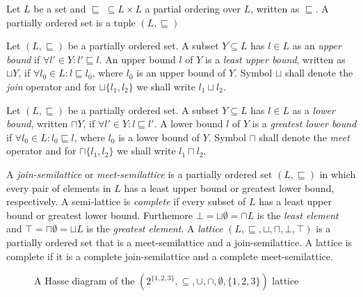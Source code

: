 \begin{defn}
Let $L$ be a set and $\sqsubseteq \; \subseteq L \times L$ a partial ordering over $L$, written as $\sqsubseteq$. A partially ordered set is a tuple $(L, \sqsubseteq)$
\end{defn}

\begin{defn}
Let $(L, \sqsubseteq)$ be a partially ordered set. A subset $Y \subseteq L$ has $l \in L$ as an \emph{upper bound} if $\forall l' \in Y: l' \sqsubseteq l$. An upper bound $l$ of $Y$ is a \emph{least upper bound}, written as $\sqcup Y$, if $\forall l_0 \in L: l \sqsubseteq l_0$, where $l_0$ is an upper bound of $Y$. Symbol $\sqcup$ shall denote the \emph{join} operator and for $\sqcup\{l_1, l_2\}$ we shall write $l_1 \sqcup l_2$.
\end{defn}

\begin{defn}
Let $(L, \sqsubseteq)$ be a partially ordered set. A subset $Y \subseteq L$ has $l \in L$ as a \emph{lower bound}, written $\sqcap Y$, if $\forall l' \in Y: l \sqsubseteq l'$. A lower bound $l$ of $Y$ is a \emph{greatest lower bound} if $\forall l_0 \in L: l_0 \sqsubseteq l$, where $l_0$ is a lower bound of $Y$. Symbol $\sqcap$ shall denote the \emph{meet} operator and for $\sqcap\{l_1, l_2\}$ we shall write $l_1 \sqcap l_2$.
\end{defn}

\begin{defn}
A \emph{join-semilattice} or \emph{meet-semilattice} is a partially ordered set $(L, \sqsubseteq)$ in which every pair of elements in $L$ has a least upper bound or greatest lower bound, respectively. A semi-lattice is \emph{complete} if every subset of $L$ has a least upper bound or greatest lower bound. Furthemore $\bot = \sqcup \emptyset = \sqcap L$ is the \emph{least element} and $\top = \sqcap \emptyset = \sqcup L$ is the \emph{greatest element}. A \emph{lattice} $(L, \sqsubseteq, \sqcup, \sqcap, \bot, \top)$ is a partially ordered set that is a meet-semilattice and a join-semilattice. A lattice is complete if it is a complete join-semilattice and a complete meet-semilattice.
\end{defn}

\begin{figure}[H]
    \centering
    \caption{A Hasse diagram of the $(2^{\{1,2,3\}}, \subseteq, \cup, \cap, \emptyset, \{1,2,3\})$ lattice}
    \label{fig_absintr_intervals}
\end{figure}

